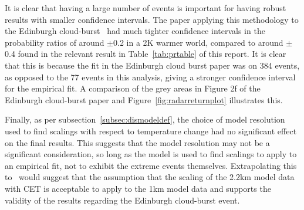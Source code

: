 It is clear that having a large number of events is important for having robust results with smaller confidence intervals.
The paper applying this methodology to the Edinburgh cloud-burst~\cite{Tett_Soon}
    had much tighter confidence intervals in the probability ratios of around $\pm$0.2
    in a 2K warmer world,
    compared to around $\pm$0.4 found in the relevant result in Table~\ref{tab:prtable} of this report.
It is clear that this is because the fit in the Edinburgh cloud burst paper was on 384 events,
    as opposed to the 77 events in this analysis,
    giving a stronger confidence interval for the empirical fit.
A comparison of the grey areas in Figure 2f of the Edinburgh cloud-burst paper and Figure~\ref{fig:radarreturnplot} illustrates this.

Finally, as per subsection~\ref{subsec:dismodeldef},
    the choice of model resolution used to find scalings with respect to temperature change
    had no significant effect on the final results.
This suggests that the model resolution may not be a significant consideration,
    so long as the model is used to find scalings to apply to an empirical fit,
    not to exhibit the extreme events themselves.
Extrapolating this to~\cite{Tett_Soon} would suggest that the assumption that the
    scaling of the 2.2km model data with CET is acceptable to apply to the 1km model data and supports the validity of the results regarding the Edinburgh cloud-burst event.